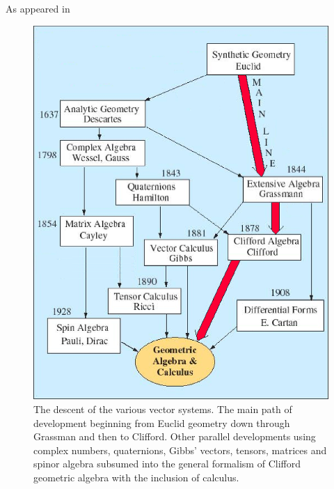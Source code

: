 \documentclass[10pt]{beamer}
\begin{document}
\begin{frame}[shrink=20]{As appeared in \cite{abbott2}}

\begin{center}
\begin{figure}

\includegraphics[scale=0.47]{DescentVectors}

\caption{\label{DescentOfVectors} The descent of the various vector systems. The main path of development beginning from Euclid geometry down through Grassman and then to Clifford. Other parallel developments using complex numbers, quaternions, Gibbs' vectors, tensors, matrices and spinor algebra subsumed into the general formalism of Clifford geometric algebra with the inclusion of calculus.}
\end{figure}
\end{center}

\end{frame}
\end{document}
